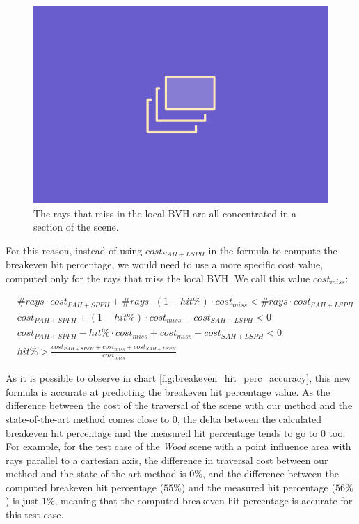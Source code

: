 \documentclass{PoliMi_MasterThesis}
\begin{document}
\begin{figure}[H] 
	\includegraphics[width=\textwidth]{Images/TODO.png}
	\caption{The rays that miss in the local BVH are all concentrated in a section of the scene.}
	\label{fig:ray_missin_local}
\end{figure}

For this reason, instead of using $cost_{SAH+LSPH}$ in the formula to compute the breakeven hit percentage, we would need to use a more specific cost value, computed only for the rays that miss the local BVH. We call this value $cost_{miss}$:

\begin{subequations}
	\begin{align*}
		&\#rays \cdot cost_{PAH+SPFH} + \#rays \cdot (1-hit\%) \cdot cost_{miss} < \#rays \cdot cost_{SAH+LSPH}\\
		&cost_{PAH+SPFH} + (1-hit\%) \cdot cost_{miss} - cost_{SAH+LSPH} < 0\\
		&cost_{PAH+SPFH} - hit\% \cdot cost_{miss} + cost_{miss} - cost_{SAH+LSPH} < 0\\
		&hit\% > \frac{cost_{PAH+SPFH} + cost_{miss} + cost_{SAH+LSPH}}{cost_{miss}}
	\end{align*}
\end{subequations}

As it is possible to observe in chart \ref{fig:breakeven_hit_perc_accuracy}, this new formula is accurate at predicting the breakeven hit percentage value. As the difference between the cost of the traversal of the scene with our method and the state-of-the-art method comes close to 0, the delta between the calculated breakeven hit percentage and the measured hit percentage tends to go to 0 too. For example, for the test case of the \textit{Wood} scene with a point influence area with rays parallel to a cartesian axis, the difference in traversal cost between our method and the state-of-the-art method is $0\%$, and the difference between the computed breakeven hit percentage ($55\%$) and the measured hit percentage ($56\%$) is just $1\%$, meaning that the computed breakeven hit percentage is accurate for this test case.
\end{document}
